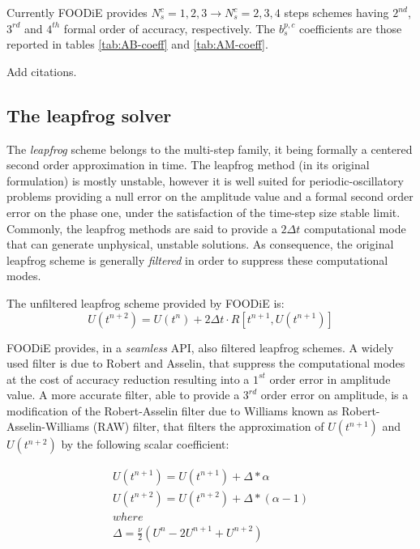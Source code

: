 \documentclass[pdftex,preprint,3p,times,numbers]{elsarticle}
\begin{document}
Currently FOODiE provides $N_s^c=1, 2, 3 \rightarrow N_s^c=2, 3, 4$ steps schemes having $2^{nd}$, $3^{rd}$ and $4^{th}$ formal order of accuracy, respectively. The $b_s^{p,c}$ coefficients are those reported in tables \ref{tab:AB-coeff} and \ref{tab:AM-coeff}.

{\color{red} Add citations.}

\subsection{The leapfrog solver}

The \emph{leapfrog} scheme belongs to the multi-step family, it being formally a centered second order approximation in time. The leapfrog method (in its original formulation) is mostly unstable, however it is well suited for periodic-oscillatory problems providing a null error on the amplitude value and a formal second order error on the phase one, under the satisfaction of the time-step size stable limit. Commonly, the leapfrog methods are said to provide a $2 \Delta t$ computational mode that can generate unphysical, unstable solutions. As consequence, the original leapfrog scheme is generally \emph{filtered} in order to suppress these computational modes.

The unfiltered leapfrog scheme provided by FOODiE is:
\begin{equation}
  U\left(t^{n+2}\right) = U\left(t^{n}\right) + 2\Delta t \cdot R\left[t^{n+1}, U\left(t^{n+1}\right)\right]
\label{eq:leapfrog}
\end{equation}

FOODiE provides, in a \emph{seamless} API, also filtered leapfrog schemes. A widely used filter is due to Robert and Asselin, that suppress the computational modes at the cost of accuracy reduction resulting into a $1^{st}$ order error in amplitude value. A more accurate filter, able to provide a $3^{rd}$ order error on amplitude, is a modification of the Robert-Asselin filter due to Williams known as Robert-Asselin-Williams (RAW) filter, that filters the approximation of $U\left(t^{n+1}\right)$ and $U\left(t^{n+2}\right)$ by the following scalar coefficient:

\begin{equation}
  \begin{matrix}
    U\left(t^{n+1}\right) = U\left(t^{n+1}\right) + \Delta * \alpha     \\
    U\left(t^{n+2}\right) = U\left(t^{n+2}\right) + \Delta * (\alpha-1) \\
    where \\
    \Delta = \frac{\nu}{2}(U^{n} - 2 U^{n+1} + U^{n+2})
  \end{matrix}
\label{eq:leapfrog-RAW}
\end{equation}
\end{document}
